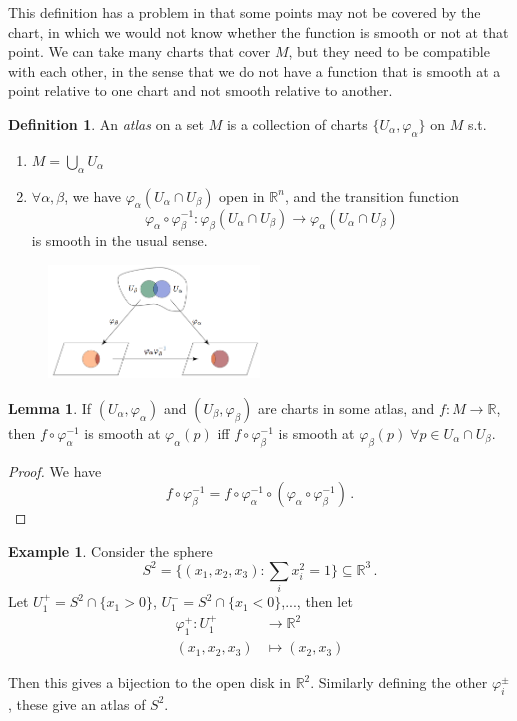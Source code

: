 \documentclass[a4paper,11pt]{article}
\theoremstyle{definition}
\newtheorem*{defn}{Definition}
\newtheorem*{ex}{Example}
\newtheorem*{lem}{Lemma}
\numberwithin{equation}{section}
\begin{document}
This definition has a problem in that some points may not be covered by the chart, in which we would not know whether the function is smooth or not at that point. We can take many charts that cover $M$, but they need to be compatible with each other, in the sense that we do not have a function that is smooth at a point relative to one chart and not smooth relative to another.

\begin{defn}
An \emph{atlas} on a set $M$ is a collection of charts $\{U_\alpha,\varphi_\alpha\}$ on $M$ s.t.
\begin{enumerate}
    \item $M=\bigcup_\alpha U_\alpha$
    \item $\forall\alpha,\beta$, we have $\varphi_\alpha(U_\alpha\cap U_\beta)$ open in $\mathbb{R}^n$, and the transition function
    \begin{equation}
        \varphi_\alpha\circ\varphi_\beta^{-1}:\varphi_\beta(U_\alpha\cap U_\beta)\rightarrow\varphi_\alpha(U_\alpha\cap U_\beta)
    \end{equation}
    is smooth in the usual sense.
\end{enumerate}
\begin{figure}[h]
    \centering
    \includegraphics[width=0.5\textwidth]{atlas.png}
\end{figure}
\end{defn}

\begin{lem}
If $(U_\alpha,\varphi_\alpha)$ and $(U_\beta,\varphi_\beta)$ are charts in some atlas, and $f:M\rightarrow\mathbb{R}$, then $f\circ\varphi_\alpha^{-1}$ is smooth at $\varphi_\alpha(p)$ iff $f\circ\varphi_\beta^{-1}$ is smooth at $\varphi_\beta(p)\;\forall p\in U_\alpha\cap U_\beta$.
\end{lem}

\begin{proof}
We have
\[
f\circ\varphi_\beta^{-1}=f\circ\varphi_\alpha^{-1}\circ(\varphi_\alpha\circ\varphi_\beta^{-1})\,.
\]
\end{proof}

\begin{ex}
Consider the sphere
\[
S^2=\{(x_1,x_2,x_3):\sum_i x_i^2=1\}\subseteq\mathbb{R}^3\,.
\]
Let $U_1^+=S^2\cap\{x_1>0\}$, $U_1^-=S^2\cap\{x_1<0\}$,..., then let
\begin{align*}
\varphi^+_1:U_1^+&\rightarrow\mathbb{R}^2\\
(x_1,x_2,x_3)&\mapsto (x_2,x_3)
\end{align*}

Then this gives a bijection to the open disk in $\mathbb{R}^2$. Similarly defining the other $\varphi_i^\pm$, these give an atlas of $S^2$.
\end{ex}
\end{document}
